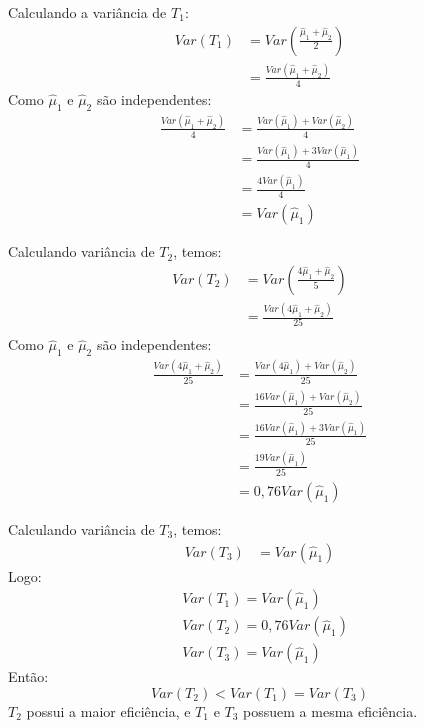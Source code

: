 \documentclass[
	12pt,				%
	openright,			%
	oneside,			%
	a4paper,			%
	english,			%
	brazil,				%
	]{abntex2}
\begin{document}
\begin{enumerate}[label=\alph*)]
Calculando a variância de $T_1$:
\begin{align*}
    Var(T_1) &= Var\left(\frac{\hat{\mu}_1 + \hat{\mu}_2}{2}\right)\\
    &= \frac{Var(\hat{\mu}_1 + \hat{\mu}_2)}{4}
\end{align*}
Como $\hat{\mu}_1$ e $\hat{\mu}_2$ são independentes:
\begin{align*}
    \frac{Var(\hat{\mu}_1 + \hat{\mu}_2)}{4} &= \frac{Var(\hat{\mu}_1) + Var(\hat{\mu}_2)}{4}\\
    &= \frac{Var(\hat{\mu}_1) + 3Var(\hat{\mu}_1)}{4}\\
    &= \frac{4Var(\hat{\mu}_1)}{4}\\
    &= Var(\hat{\mu}_1)
\end{align*}

Calculando variância de $T_2$, temos:
\begin{align*}
    Var(T_2) &= Var\left(\frac{4\hat{\mu}_1 + \hat{\mu}_2}{5}\right)\\
    &= \frac{Var(4\hat{\mu}_1 + \hat{\mu}_2)}{25}\\
\end{align*}
Como $\hat{\mu}_1$ e $\hat{\mu}_2$ são independentes:
\begin{align*}
    \frac{Var(4\hat{\mu}_1 + \hat{\mu}_2)}{25} &= \frac{Var(4\hat{\mu}_1) + Var( \hat{\mu}_2)}{25}\\
    &= \frac{16Var(\hat{\mu}_1) + Var(\hat{\mu}_2)}{25}\\
    &= \frac{16Var(\hat{\mu}_1) + 3Var( \hat{\mu}_1)}{25}\\
    &= \frac{19Var(\hat{\mu}_1)}{25}\\
    &= 0,76Var(\hat{\mu}_1)
\end{align*}

Calculando variância de $T_3$, temos:
\begin{align*}
    Var(T_3) &= Var(\hat{\mu}_1)
\end{align*}
Logo:
\begin{align*}
    &Var(T_1) = Var(\hat{\mu}_1)\\ 
    &Var(T_2) = 0,76Var(\hat{\mu}_1)\\ 
    &Var(T_3) = Var(\hat{\mu}_1)
\end{align*}
Então:
$$Var(T_2) < Var(T_1) = Var(T_3)$$
$T_2$ possui a maior eficiência, e $T_1$ e $T_3$ possuem a mesma eficiência.
\end{enumerate}
\end{document}
